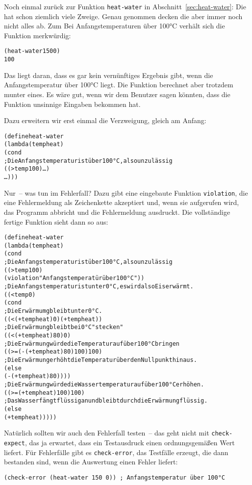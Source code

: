 Noch einmal zurück zur Funktion \texttt{heat-water} in
Abschnitt~\ref{sec:heat-water}: Die hat schon ziemlich viele Zweige.
Genau genommen decken die aber immer noch nicht alles ab.  Zum
Bei Anfangstemperaturen über 100°C verhält sich die Funktion merkwürdig:
%
\begin{alltt}
(heat-water 150 0)
\evalsto{} 100
\end{alltt}
%
Das liegt daran, dass es gar kein vernünftiges Ergebnis gibt, wenn die
Anfangstemperatur über 100°C liegt.  Die Funktion berechnet aber
trotzdem munter eines.  Es wäre gut, wenn wir dem Benutzer sagen
könnten, dass die Funktion unsinnige Eingaben bekommen hat.

Dazu erweitern wir erst einmal die Verzweigung, gleich am Anfang:
%
\begin{alltt}
(define heat-water
  (lambda (temp heat)
    (cond
      ; Die Anfangstemperatur ist über 100°C, also unzulässig
      ((> temp 100) \ldots)
      \ldots)))
\end{alltt}
%
Nur~-- was tun im Fehlerfall?  Dazu gibt eine eingebaute Funktion
\texttt{violation}, die eine Fehlermeldung als Zeichenkette akzeptiert
und, wenn sie aufgerufen wird, das Programm abbricht und die
Fehlermeldung ausdruckt.  Die vollständige fertige Funktion sieht
dann so aus:
%
\begin{alltt}
(define heat-water
  (lambda (temp heat)
    (cond
      ; Die Anfangstemperatur ist über 100°C, also unzulässig
      ((> temp 100)
       (violation "Anfangstemperatür über 100°C"))
      ; Die Anfangstemperatur ist unter 0°C, es wird also Eis erwärmt.
      ((< temp 0)
       (cond
         ; Die Erwärmumg bleibt unter 0°C.
         ((< (+ temp heat) 0) (+ temp heat))
         ; Die Erwärmung bleibt bei  0°C "stecken"
         ((< (+ temp heat) 80) 0)
         ; Die Erwärmung würde die Temperatur auf über 100°C bringen
         ((>= (- (+ temp heat) 80) 100) 100)
         ; Die Erwärmung erhöht die Temperatur über den Nullpunkt hinaus.
         (else
          (- (+ temp heat) 80))))
      ; Die Erwärmung würde die Wassertemperatur auf über 100°C erhöhen.
      ((>= (+ temp heat) 100) 100)
      ; Das Wasser fängt flüssig an und bleibt durch die Erwärmung flüssig.
      (else
       (+ temp heat)))))
\end{alltt}
%
Natürlich sollten wir auch den Fehlerfall testen~-- das geht nicht mit
\texttt{check-expect}, das ja erwartet, dass ein Testausdruck einen
ordnungsgemäßen Wert liefert.  Für Fehlerfälle gibt es
\texttt{check-error}, das Testfälle erzeugt, die dann bestanden sind,
wenn die Auswertung einen Fehler liefert:
%
\begin{verbatim}
(check-error (heat-water 150 0)) ; Anfangstemperatur über 100°C
\end{verbatim}

